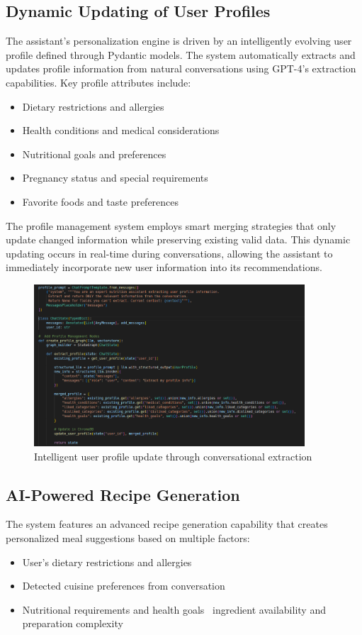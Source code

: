 \subsection{Dynamic Updating of User Profiles}
The assistant's personalization engine is driven by an intelligently evolving user profile defined through Pydantic models. The system automatically extracts and updates profile information from natural conversations using GPT-4's extraction capabilities. Key profile attributes include:
\begin{itemize}
\item Dietary restrictions and allergies
\item Health conditions and medical considerations
\item Nutritional goals and preferences
\item Pregnancy status and special requirements
\item Favorite foods and taste preferences
\end{itemize}

The profile management system employs smart merging strategies that only update changed information while preserving existing valid data. This dynamic updating occurs in real-time during conversations, allowing the assistant to immediately incorporate new user information into its recommendations.
\begin{center}
\begin{figure}[H]
\includegraphics[width=0.9\textwidth]{images/update_user_profile.png}
\caption{Intelligent user profile update through conversational extraction}
\label{fig:user_update_profile}
\end{figure}
\end{center}

\subsection{AI-Powered Recipe Generation}
The system features an advanced recipe generation capability that creates personalized meal suggestions based on multiple factors:
\begin{itemize}
\item User's dietary restrictions and allergies
\item Detected cuisine preferences from conversation
\item Nutritional requirements and health goals
\ ingredient availability and preparation complexity
\end{itemize}

